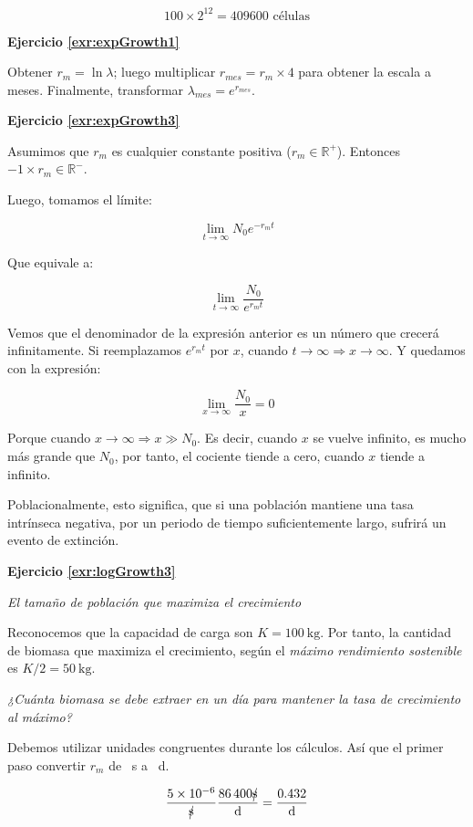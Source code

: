 \documentclass[12pt,letterpaper,]{book}
\begin{document}
\[
100\times 2^{12} = \num{409600}\text{ células}
\]

\textbf{Ejercicio \ref{exr:expGrowth1}}

Obtener \(r_m = \ln \lambda\); luego multiplicar
\(r_{mes}=r_m \times 4\) para obtener la escala a meses. Finalmente,
transformar \(\lambda_{mes}=e^{r_{mes}}\).

\textbf{Ejercicio \ref{exr:expGrowth3}}

Asumimos que \(r_m\) es cualquier constante positiva
(\(r_m \in \mathbb{R}^+\)). Entonces \(-1\times r_m \in \mathbb{R}^-\).

Luego, tomamos el límite:

\[
\lim_{t \to \infty}N_0 e^{-r_m t}
\]

Que equivale a:

\[
\lim_{t \to \infty}\frac{N_0}{e^{r_m t}}
\]

Vemos que el denominador de la expresión anterior es un número que
crecerá infinitamente. Si reemplazamos \(e^{r_m t}\) por \(x\), cuando
\(t \to \infty \Rightarrow x \to \infty\). Y quedamos con la expresión:

\[
\lim_{x \to \infty}\frac{N_0}{x} = 0
\]

Porque cuando \(x \to \infty \Rightarrow x \gg N_0\). Es decir, cuando
\(x\) se vuelve infinito, es mucho más grande que \(N_0\), por tanto, el
cociente tiende a cero, cuando \(x\) tiende a infinito.

Poblacionalmente, esto significa, que si una población mantiene una tasa
intrínseca negativa, por un periodo de tiempo suficientemente largo,
sufrirá un evento de extinción.

\textbf{Ejercicio \ref{exr:logGrowth3}}

\emph{El tamaño de población que maximiza el crecimiento}

Reconocemos que la capacidad de carga son \(K=\SI{100}{\kilogram}\). Por
tanto, la cantidad de biomasa que maximiza el crecimiento, según el
\emph{máximo rendimiento sostenible} es \(K/2=\SI{50}{\kilogram}\).

\emph{¿Cuánta biomasa se debe extraer en un día para mantener la tasa de
crecimiento al máximo?}

Debemos utilizar unidades congruentes durante los cálculos. Así que el
primer paso convertir \(r_m\) de \si{\per\second} a \si{\per\day}.

\[
\frac{\num{5e-6} }
{\cancel{ \si{\second} } }
\frac{\num{86400}\cancel{\si{\second}} }{\si{\day}}= 
\frac{\num{0.432}}
{\si{\day}}
\]
\end{document}
